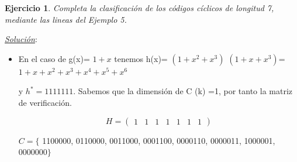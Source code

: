 \documentclass{beamer}
\theoremstyle{plain}
\theoremstyle{example}
\newtheorem{ejercicio} [Ejercicio]{Ejercicio}
\theoremstyle{example}
\begin{document}
\begin{frame}  \small \begin{ejercicio} 

 Completa la clasificación de los códigos cíclicos de longitud 7, mediante las lineas del Ejemplo 5.


\end{ejercicio} %
\textit{\underline{Solución}}:\\ 

\begin{itemize}
\item En el caso de g(x)= $1+x$ tenemos h(x)= $(1+x^2+x^3)$ $(1+x+x^3)$= $1+x+x^2+x^3+x^4+x^5+x^6$

y $h^* =1111111$. Sabemos que la dimensión de C (k) =1, por tanto la matriz de verificación.

\[
    H =   \left( \begin{array}{ccccccc}
     				  1 &  1  & 1  & 1 & 1  & 1  & 1
           			\end{array}
    		\right) 	    		
\]

\vspace*{5pt}
$C=\{$ 1100000, 0110000, 0011000, 0001100, 0000110, 0000011, 1000001, 0000000$\}$\\
\vspace*{5pt}

\end{itemize}

\end{frame} 
\end{document}
